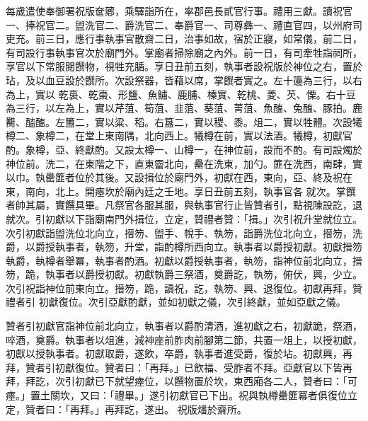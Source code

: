 \begin{pinyinscope}
 每歲遣使奉御署祝版奩薌，乘驛詣所在，率郡邑長貳官行事。禮用三獻。讀祝官一、捧祝官二。盥洗官二、爵洗官二、奉爵官一、司尊彝一、禮直官四，以州府司吏充。前三日，應行事執事官散齋二日，治事如故，宿於正寢，如常儀，前二日，有司設行事執事官次於廟門外。掌廟者掃除廟之內外。前一日，有司牽牲詣祠所，享官以下常服閱饌物，視牲充腯。享日丑前五刻，執事者設祝版於神位之右，置於玷，及以血豆設於饌所。次設祭器，皆藉以席，掌饌者實之。左十籩為三行，以右為上，實以
 乾裛、乾棗、形鹽、魚鱐、鹿脯、榛實、乾桃、菱、芡、慄。右十豆為三行，以左為上，實以芹菹、筍菹、韭菹、葵菹、菁菹、魚醢、兔醢、豚拍。鹿臡、醓醢。左簠二，實以粱、稻。右簋二，實以稷、黍。俎二，實以牲體。次設犧樽二、象樽二，在堂上東南隅，北向西上。犧樽在前，實以法酒。犧樽，初獻官酌。象樽，亞、終獻酌。又設太樽一、山樽一，在神位前，設而不酌。有司設燭於神位前。洗二，在東階之下，直東霤北向，罍在洗東，加勺。篚在洗西，南肆，實以巾。執罍篚者位於其後。又設揖位於廟門外，初獻在西，東向，亞、終及祝在東，南向，北上。開瘞坎於廟內廷之壬地。享日丑前五刻，執事官各
 就次。掌饌者帥其屬，實饌具畢。凡祭官各服其服，與執事官行止皆贊者引，點視陳設訖，退就次。引初獻以下詣廟南門外揖位，立定，贊禮者贊：「揖。」次引祝升堂就位立。次引初獻詣盥洗位北向立，搢笏、盥手、帨手、執笏，詣爵洗位北向立，搢笏，洗爵，以爵授執事者，執笏，升堂，詣酌樽所西向立。執事者以爵授初獻。初獻搢笏執爵，執樽者舉冪，執事者酌酒。初獻以爵授執事者，執笏，詣神位前北向立，搢笏，跪，執事者以爵授初獻。初獻執爵三祭酒，奠爵訖，執笏，俯伏，興，少立。次引祝詣神位前東向立。搢笏，跪，讀祝，訖，執笏、興、退復位。初獻再拜，贊禮者引
 初獻復位。次引亞獻酌獻，並如初獻之儀，次引終獻，並如亞獻之儀。



 贊者引初獻官詣神位前北向立，執事者以爵酌清酒，進初獻之右，初獻跪，祭酒，啐酒，奠爵。執事者以俎進，減神座前胙肉前腳第二節，共置一俎上，以授初獻，初獻以授執事者。初獻取爵，遂飲，卒爵，執事者進受爵，復於坫。初獻興，再拜，贊者引初獻復位。贊者曰：「再拜。」已飲福、受胙者不拜。亞獻官以下皆再拜，拜訖，次引初獻已下就望瘞位，以饌物置於坎，東西廂各二人，贊者曰：「可瘞。」置土關坎，又曰：「禮畢。」遂引初獻官已下出。祝與執樽罍篚冪者俱復位立定，贊者曰：「再拜。」再拜訖，遂出。
 祝版燔於齋所。



\end{pinyinscope}